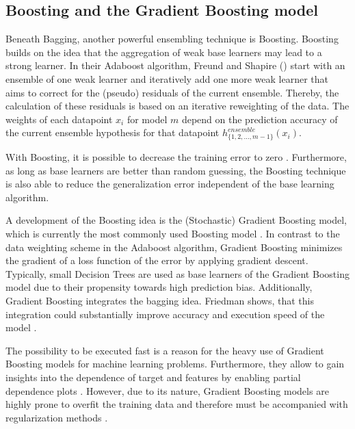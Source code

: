 \documentclass[12pt]{article}
\begin{document}
\subsection{Boosting and the Gradient Boosting model}
Beneath Bagging, another powerful ensembling technique is Boosting. Boosting builds on the idea that the aggregation of weak base learners may lead to a strong learner. In their Adaboost algorithm, Freund and Shapire (\citeyear{freund1996experiments}) start with an ensemble of one weak learner and iteratively add one more weak learner that aims to correct for the (pseudo) residuals of the current ensemble. Thereby, the calculation of these residuals is based on an iterative reweighting of the data. The weights of each datapoint $x_{i}$ for model $m$ depend on the prediction accuracy of the current ensemble hypothesis for that datapoint $h^{ensemble}_{\{1,2,...,m-1\}}(x_{i})$. 

With Boosting, it is possible to decrease the training error to zero \citep[p.11ff.]{freund1996experiments}. Furthermore, as long as base learners are better than random guessing, the Boosting technique is also able to reduce the generalization error independent of the base learning algorithm.

A development of the Boosting idea is the (Stochastic) Gradient Boosting model, which is currently the most commonly used Boosting model \citep{friedman2001greedy, friedman2002stochastic}. In contrast to the data weighting scheme in the Adaboost algorithm, Gradient Boosting minimizes the gradient of a loss function of the error by applying gradient descent. Typically, small Decision Trees are used as base learners of the Gradient Boosting model due to their propensity towards high prediction bias. Additionally, Gradient Boosting integrates the bagging idea. Friedman shows, that this integration could substantially improve accuracy and execution speed of the model \citep{friedman2002stochastic}.

The possibility to be executed fast is a reason for the heavy use of Gradient Boosting models for machine learning problems. Furthermore, they allow to gain insights into the dependence of target and features by enabling partial dependence plots \citep[p.1219ff.]{friedman2001greedy}. However, due to its nature, Gradient Boosting models are highly prone to overfit the training data and therefore must be accompanied with regularization methods \citep[p.1203]{friedman2002stochastic}.

\end{document}
